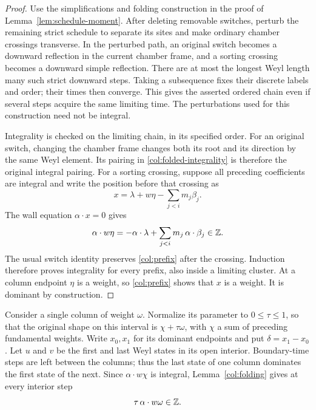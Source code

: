 \begin{proof}
Use the simplifications and folding construction in the proof of
Lemma~\ref{lem:schedule-moment}.  After deleting removable switches,
perturb the remaining strict schedule to separate its sites and make
ordinary chamber crossings transverse.  In the perturbed path, an
original switch becomes a downward reflection in the current chamber
frame, and a sorting crossing becomes a downward simple reflection.
There are at most the longest Weyl length many such strict downward
steps.  Taking a subsequence fixes their discrete labels and order;
their times then converge.  This gives the asserted ordered chain even
if several steps acquire the same limiting time.  The perturbations
used for this construction need not be integral.

Integrality is checked on the limiting chain, in its specified order.
For an original switch, changing the chamber frame changes both its
root and its direction by the same Weyl element.  Its pairing in
\eqref{col:folded-integrality} is therefore the original integral
pairing.  For a sorting crossing, suppose all preceding coefficients
are integral and write the position before that crossing as
\begin{equation}\label{col:prefix}
 x=\lambda+w\eta-\sum_{j< i}m_j\beta_j.
\end{equation}
The wall equation $\alpha\cdot x=0$ gives
\[
 \alpha\cdot w\eta
 =-\alpha\cdot\lambda
   +\sum_{j<i}m_j\,\alpha\cdot\beta_j\in\mathbb Z.
\]
The usual switch identity preserves \eqref{col:prefix} after the
crossing.  Induction therefore proves integrality for every prefix,
also inside a limiting cluster.  At a column endpoint $\eta$ is a
weight, so \eqref{col:prefix} shows that $x$ is a weight.  It is
dominant by construction.
\end{proof}

Consider a single column of weight $\omega$.  Normalize its parameter
to $0\le\tau\le1$, so that the original shape on this interval is
$\chi+\tau\omega$, with $\chi$ a sum of preceding fundamental
weights.  Write $x_0,x_1$ for its dominant endpoints and put
$\delta=x_1-x_0$.  Let $u$ and $v$ be the first and last Weyl states
in its open interior.  Boundary-time steps are left between the
columns; thus the last state of one column dominates the first state
of the next.  Since $\alpha\cdot w\chi$ is integral,
Lemma~\ref{col:folding} gives at every interior step
\begin{equation}\label{col:local-level}
 \tau\,\alpha\cdot w\omega\in\mathbb Z.
\end{equation}

